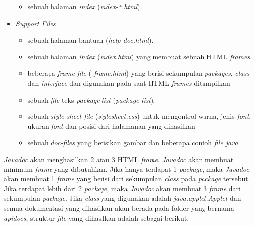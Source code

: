 \begin{itemize}
\begin{itemize}
		\item sebuah halaman {\it index} ({\it index-*.html}).
	\end{itemize}
	\item {\it Support Files}
	\begin{itemize}
		\item sebuah halaman bantuan ({\it help-doc.html}).
		\item sebuah halaman {\it index} ({\it index.html}) yang membuat sebuah HTML {\it frames}.
		\item beberapa {\it frame file} ({\it *-frame.html}) yang berisi sekumpulan {\it packages}, {\it class} dan {\it interface} dan digunakan pada saat HTML {\it frames} ditampilkan
		\item sebuah {\it file} teks {\it package list} ({\it package-list}).
		\item sebuah {\it style sheet file} ({\it stylesheet.css}) untuk mengontrol warna, jenis {\it font}, ukuran {\it font} dan posisi dari halamanan yang dihasilkan
		\item sebuah {\it doc-files} yang berisikan gambar dan beberapa contoh {\it file java}
	\end{itemize}
\end{itemize}
{\it Javadoc} akan menghasilkan 2 atau 3 HTML {\it frame}. {\it Javadoc} akan membuat minimum {\it frame} yang dibutuhkan. Jika hanya terdapat 1 {\it package}, maka {\it Javadoc} akan membuat 1 {\it frame} yang berisi dari sekumpulan {\it class} pada {\it package} tersebut. Jika terdapat lebih dari 2 {\it package}, maka {\it Javadoc} akan membuat 3 {\it frame} dari sekumpulan {\it package}. Jika {\it class} yang digunakan adalah {\it java.applet.Applet} dan semua dokumentasi yang dihasilkan akan berada pada folder yang bernama {\it apidocs}, struktur {\it file} yang dihasilkan adalah sebagai berikut:
